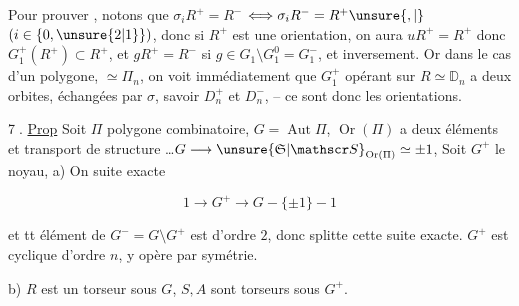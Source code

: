 
Pour prouver , notons que $\sigma_{i}R^+=R^-$ $\Longleftrightarrow \sigma_i R^-=R^+\unsure{,|{}}$ $(i\in\{0,\unsure{2|1}\})$, donc si $R^+$ est une orientation, on aura $uR^+=R^+$ donc $G_1^+(R^+)\subset R^+$, et $gR^+=R^-$ si $g\in G_1\setminus G_1^0=G_1^-$,  et inversement. Or dans le cas d'un polygone,   $\simeq\Pi_{n}$, on voit immédiatement que $G_1^+$ opérant sur $R\simeq\mathbb D_n$ a  deux orbites,   échangées par $\sigma$, savoir $D_n^+$ et $D_n^-$, -- ce sont donc  les orientations.

 \textcircled{7}. \uline{Prop} Soit $\Pi$  polygone combinatoire,   $G=\operatorname{Aut}\Pi$,  $\operatorname{Or}(\Pi)$ a deux éléments et  transport de structure \dots $G\longrightarrow\unsure{\mathfrak S|\mathscr S}_{\operatorname{Or}(\Pi)}\simeq\pm1$,  Soit $G^+$ le noyau, a) On   suite exacte

\[
1\longrightarrow G^+\longrightarrow G\mathbin{-}\{\pm1\}\mathbin{-}1
\]

et tt élément de $G^-=G\setminus G^+$ est d'ordre $2$, donc splitte cette suite exacte.   $G^+$ est cyclique d'ordre $n$,   y opère par symétrie.

b) $R$ est un torseur sous $G$, $S,A$ sont torseurs sous $G^+$.

